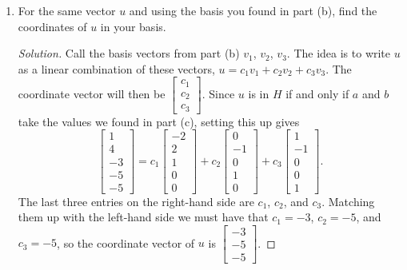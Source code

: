 \documentclass[11pt,letterpaper]{report}
\newenvironment{solution}
{\begin{proof}[Solution]}
{\end{proof}}
\begin{document}
\begin{enumerate}
\begin{enumerate}
		\item For the same vector $u$ and using the basis you found in part (b), find the coordinates of $u$ in your basis.
		\begin{solution}
			Call the basis vectors from part (b) $v_1$, $v_2$, $v_3$. The idea is to write $u$ as a linear combination of these vectors, $u = c_1v_1+c_2v_2+c_3v_3$. The coordinate vector will then be $\begin{bmatrix}
				c_1\\c_2\\c_3
			\end{bmatrix}$.
			Since $u$ is in $H$ if and only if $a$ and $b$ take the values we found in part (c), setting this up gives
			\[
			\begin{bmatrix}
				1\\4\\-3\\-5\\-5
			\end{bmatrix} = c_1 \begin{bmatrix}
				-2\\2\\1\\0\\0
			\end{bmatrix} + c_2\begin{bmatrix}
				0\\-1\\0\\1\\0
			\end{bmatrix} + c_3 \begin{bmatrix}
				1\\-1\\0\\0\\1
			\end{bmatrix}.
			\]
			The last three entries on the right-hand side are $c_1$, $c_2$, and $c_3$. Matching them up with the left-hand side we must have that $c_1 = -3$, $c_2 = -5$, and $c_3 = -5$, so the coordinate vector of $u$ is $\begin{bmatrix}
				-3\\-5\\-5
			\end{bmatrix}$.
		\end{solution}
	\end{enumerate}


\end{enumerate}
\end{document}
